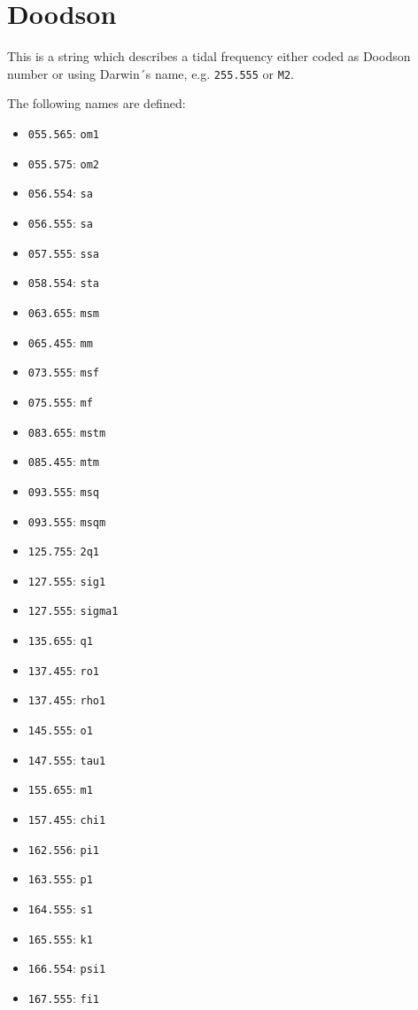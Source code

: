 \clearpage

\section{Doodson}\label{doodson}
This is a string which describes a tidal frequency either coded as Doodson number
or using Darwin´s name, e.g. \verb|255.555| or \verb|M2|.

The following names are defined:
\begin{itemize}
\item \verb|055.565|: \verb|om1|  \item \verb|055.575|: \verb|om2|     \item \verb|056.554|: \verb|sa|
\item \verb|056.555|: \verb|sa|   \item \verb|057.555|: \verb|ssa|     \item \verb|058.554|: \verb|sta|
\item \verb|063.655|: \verb|msm|  \item \verb|065.455|: \verb|mm|      \item \verb|073.555|: \verb|msf|
\item \verb|075.555|: \verb|mf|   \item \verb|083.655|: \verb|mstm|    \item \verb|085.455|: \verb|mtm|
\item \verb|093.555|: \verb|msq|  \item \verb|093.555|: \verb|msqm|    \item \verb|125.755|: \verb|2q1|
\item \verb|127.555|: \verb|sig1| \item \verb|127.555|: \verb|sigma1|  \item \verb|135.655|: \verb|q1|
\item \verb|137.455|: \verb|ro1|  \item \verb|137.455|: \verb|rho1|    \item \verb|145.555|: \verb|o1|
\item \verb|147.555|: \verb|tau1| \item \verb|155.655|: \verb|m1|      \item \verb|157.455|: \verb|chi1|
\item \verb|162.556|: \verb|pi1|  \item \verb|163.555|: \verb|p1|      \item \verb|164.555|: \verb|s1|
\item \verb|165.555|: \verb|k1|   \item \verb|166.554|: \verb|psi1|    \item \verb|167.555|: \verb|fi1|

\end{itemize}
